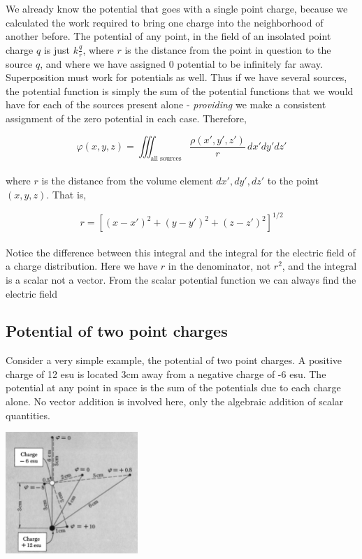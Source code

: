 \documentclass[svgnames]{article}
\begin{document}
 We already know the potential that goes with a single point charge, because we calculated the work required to bring one charge into the neighborhood of another before. The potential of any point, in the field of an insolated point charge $q$ is just $k\frac{q}{r}$, where $r$ is the distance from the point in question to the source $q$, and where we have assigned 0 potential to be infinitely far away.  \\
 
 Superposition must work for potentials as well. Thus if we have several sources, the potential function is simply the sum of the potential functions that we would have for each of the sources present alone - \textit{providing} we make a consistent assignment of the zero potential in each case. Therefore, 
 
 \[ \varphi(x, y, z) = \iiint_\text{all sources} \frac{\rho (x', y', z')}{r} \, dx'dy'dz' \] \\
 
 where $r$ is the distance from the volume element $dx', dy', dz'$ to the point $(x, y, z)$. That is, 
 
 \[ r = [(x-x')^2 + (y-y')^2 + (z-z')^2 ]^{1/2} \] \\
 
 Notice the difference between this integral and the integral for the electric field of a charge distribution. Here we have $r$ in the denominator, not $r^2$, and the integral is a scalar not a vector. From the scalar potential function we can always find the electric field 
 
 \subsection{Potential of two point charges} 
 
 Consider a very simple example, the potential of two point charges. A positive charge of 12 esu is located 3cm away from a negative charge of -6 esu. The potential at any point in space is the sum of the potentials due to each charge alone. No vector addition is involved here, only the algebraic addition of scalar quantities. 

\begin{center}
\includegraphics[width = 50mm]{ss9.png}
\end{center} 
\end{document}
